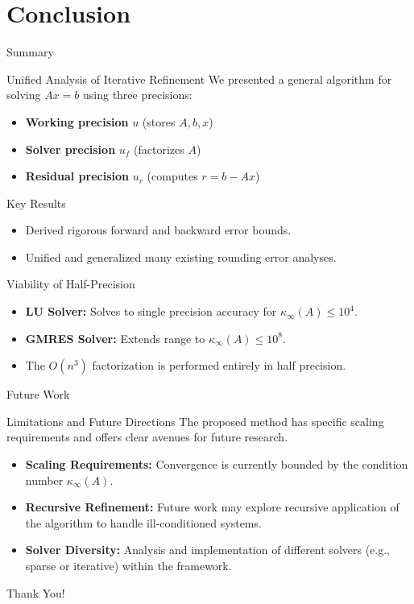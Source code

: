 \documentclass[
	11pt,
	aspectratio=169,
]{beamer}
\begin{document}
\section{Conclusion}


\begin{frame}[shrink=15]{Summary}
\setlength{\itemsep}{0pt}
\begin{block}{Unified Analysis of Iterative Refinement}
\small
We presented a general algorithm for solving $A x = b$ using three precisions:
\begin{itemize}
    \item \textbf{Working precision} $u$ (stores $A, b, x$)
    \item \textbf{Solver precision} $u_f$ (factorizes $A$)
    \item \textbf{Residual precision} $u_r$ (computes $r = b - A x$)
\end{itemize}
\end{block}

\begin{block}{Key Results}
\small
\begin{itemize}
    \item Derived rigorous forward and backward error bounds.
    \item Unified and generalized many existing rounding error analyses.
\end{itemize}
\end{block}

\begin{block}{Viability of Half-Precision}
\small
\begin{itemize}
    \item \textbf{LU Solver:} Solves to single precision accuracy for $\kappa_\infty(A) \leq 10^4$.
    \item \textbf{GMRES Solver:} Extends range to $\kappa_\infty(A) \leq 10^8$.
    \item The $O(n^3)$ factorization is performed entirely in half precision.
\end{itemize}
\end{block}
\end{frame}
\begin{frame}{Future Work}
    \begin{block}{Limitations and Future Directions}
The proposed method has specific scaling requirements and offers clear avenues for future research.
\end{block}

\begin{itemize}
    \item \textbf{Scaling Requirements:} Convergence is currently bounded by the condition number $\kappa_{\infty}(A)$.
    \item \textbf{Recursive Refinement:} Future work may explore recursive application of the algorithm to handle ill-conditioned systems.
    \item \textbf{Solver Diversity:} Analysis and implementation of different solvers (e.g., sparse or iterative) within the framework.
\end{itemize}
\end{frame}
\begin{frame}
    \centering
    \Huge \color{mathblue} Thank You!
\end{frame}
\end{document}
